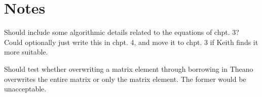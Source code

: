 \section{Notes}

Should include some algorithmic details related to the equations of chpt. 3? Could optionally just write this in chpt. 4, and move it to chpt. 3 if Keith finds it more suitable.

Should test whether overwriting a matrix element through borrowing in Theano overwrites the entire matrix or only the matrix element. The former would be unacceptable.


\cleardoublepage
